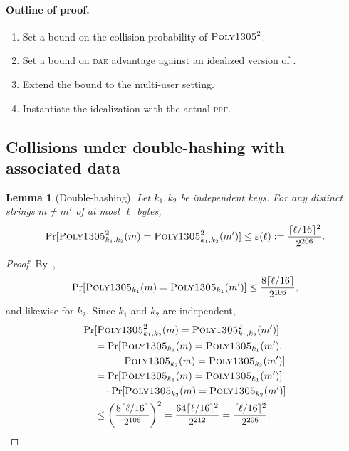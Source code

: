 \documentclass{article}
\newtheorem{lemma}{Lemma}
\def\operatorsc#1{{%
  \ifmmode\let\next=\operatorname\else\let\next=\relax\fi\next{\textsc{#1}}}}
\def\Poly#1/{\operatorsc{Poly#1}}
\def\DAENCE/{\operatorsc{Daence}}
\def\PRF{%
  \ifmmode\def\next{\operatorname{PRF}}%
    \else\def\next/{\textsc{prf}}%
  \fi\next}
\def\DAE{%
  \ifmmode\def\next{\operatorname{DAE}}%
    \else\def\next/{\textsc{dae}}%
  \fi\next}
\newcommand{\collisionbound}{\varepsilon}
\begin{document}
\paragraph*{Outline of proof.}

\begin{enumerate}
  \item Set a bound on the collision probability of $\Poly1305/^2$.
  \item Set a bound on \DAE/ advantage against an idealized version of
     \DAENCE/.
  \item Extend the bound to the multi-user setting.
  \item Instantiate the idealization with the actual \PRF/.
\end{enumerate}

\subsection{Collisions under double-hashing with associated data}

\begin{lemma}[Double-hashing]\label{double-hash}
  Let $k_1, k_2$ be independent \Poly1305/ keys.
  For any distinct strings $m \ne m'$ of at most $\ell$ bytes,
  \[
    \Pr[\Poly1305/^2_{k_1,k_2}(m) = \Poly1305/^2_{k_1,k_2}(m')]
    \leq \collisionbound(\ell)
    := \frac{\lceil\ell/16\rceil^2}{2^{206}}.
  \]
\end{lemma}

\begin{proof}
  By~\cite[Theorem~3.3]{bernstein2005poly1305},
  \[
    \Pr[\Poly1305/_{k_1}(m) = \Poly1305/_{k_1}(m')]
    \leq \frac{8\lceil\ell/16\rceil}{2^{106}},
  \]
   and likewise for $k_2$.
  Since $k_1$ and $k_2$ are independent,
  \begin{align*}
    \Pr&[\Poly1305/^2_{k_1,k_2}(m) = \Poly1305/^2_{k_1,k_2}(m')] \\
    &= \Pr[\Poly1305/_{k_1}(m) = \Poly1305/_{k_1}(m'), \\
    &\qquad\quad\Poly1305/_{k_2}(m) = \Poly1305/_{k_2}(m')] \\
    &= \Pr[\Poly1305/_{k_1}(m) = \Poly1305/_{k_1}(m')] \\
    &\quad
       \cdot
       \Pr[\Poly1305/_{k_2}(m) = \Poly1305/_{k_2}(m')] \\
    &\leq \biggl(\frac{8\lceil\ell/16\rceil}{2^{106}}\biggr)^2
     = \frac{64\lceil\ell/16\rceil^2}{2^{212}}
     = \frac{\lceil\ell/16\rceil^2}{2^{206}}.
    \qedhere
  \end{align*}
\end{proof}
\end{document}
